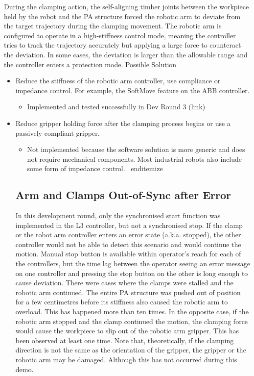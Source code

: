 During the clamping action, the self-aligning timber joints between the workpiece held by the robot and the PA structure forced the robotic arm to deviate from the target trajectory during the clamping movement. The robotic arm is configured to operate in a high-stiffness control mode, meaning the controller tries to track the trajectory accurately but applying a large force to counteract the deviation. In some cases, the deviation is larger than the allowable range and the controller enters a protection mode.
Possible Solution
\begin{itemize}
\item Reduce the stiffness of the robotic arm controller, use compliance or impedance control. For example, the SoftMove feature on the ABB controller.
    \begin{itemize}
    \item Implemented and tested successfully in Dev Round 3 (link)
    \end{itemize}
\item Reduce gripper holding force after the clamping process begins or use a passively compliant gripper.
    \begin{itemize}
    \item Not implemented because the software solution is more generic and does not require mechanical components. Most industrial robots also include some form of impedance control.
\   end{itemize}
\end{itemize}

\subsection{Arm and Clamps Out-of-Sync after Error}
In this development round, only the synchronised start function was implemented in the L3 controller, but not a synchronised stop. If the clamp or the robot arm controller enters an error state (a.k.a. stopped), the other controller would not be able to detect this scenario and would continue the motion. Manual stop button is available within operator’s reach for each of the controllers, but the time lag between the operator seeing an error message on one controller and pressing the stop button on the other is long enough to cause deviation.
There were cases where the clamps were stalled and the robotic arm continued. The entire PA structure was pushed out of position for a few centimetres before its stiffness also caused the robotic arm to overload. This has happened more than ten times.
In the opposite case, if the robotic arm stopped and the clamp continued the motion, the clamping force would cause the workpiece to slip out of the robotic arm gripper. This has been observed at least one time.
Note that, theoretically, if the clamping direction is not the same as the orientation of the gripper, the gripper or the robotic arm may be damaged. Although this has not occurred during this demo.


\end{itemize}
